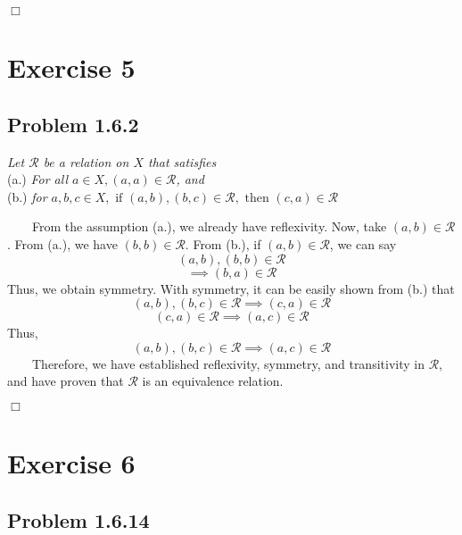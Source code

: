 \documentclass[
]{article}
\begin{document}
\hfill \(\Box\)

\hypertarget{exercise-5}{%
\section{Exercise 5}\label{exercise-5}}

\hypertarget{problem-1.6.2}{%
\subsection{Problem 1.6.2}\label{problem-1.6.2}}

\emph{Let \(\mathcal{R}\) be a relation on \(X\) that satisfies}\\
\hspace*{0.333em}\hspace*{0.333em}\hspace*{0.333em}\hspace*{0.333em}(a.)
\emph{For all \(a \in X, (a, a) \in \mathcal{R}\), and}\\
\hspace*{0.333em}\hspace*{0.333em}\hspace*{0.333em}\hspace*{0.333em}(b.)
\emph{for
\(a, b, c \in X, \text{ if } (a, b), (b, c) \in \mathcal{R}, \text{ then } (c, a) \in \mathcal{R}\)}

~~~~From the assumption (a.), we already have reflexivity. Now, take
\((a, b) \in \mathcal{R}\). From (a.), we have
\((b, b) \in \mathcal{R}\). From (b.), if \((a, b) \in \mathcal{R}\), we
can say \[(a, b), (b, b) \in \mathcal{R}\]
\[\implies (b, a) \in \mathcal{R}\] Thus, we obtain symmetry. With
symmetry, it can be easily shown from (b.) that
\[(a, b), (b, c) \in \mathcal{R} \implies (c, a) \in \mathcal{R}\]
\[(c, a) \in \mathcal{R} \implies (a, c) \in \mathcal{R}\] Thus,
\[(a, b), (b, c) \in \mathcal{R} \implies (a,c ) \in \mathcal{R}\]
~~~~Therefore, we have established reflexivity, symmetry, and
transitivity in \(\mathcal{R}\), and have proven that \(\mathcal{R}\) is
an equivalence relation.

\hfill \(\Box\)

\hypertarget{exercise-6}{%
\section{Exercise 6}\label{exercise-6}}

\hypertarget{problem-1.6.14}{%
\subsection{Problem 1.6.14}\label{problem-1.6.14}}
\end{document}
